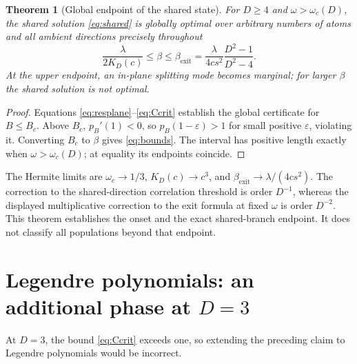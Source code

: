 \documentclass[11pt]{article}
\newcommand{\exit}{\mathrm{exit}}
\newtheorem{theorem}{Theorem}[section]
\theoremstyle{remark}
\begin{document}
\begin{theorem}[Global endpoint of the shared state]\label{thm:exit}
For $D\geq4$ and $\omega>\omega_c(D)$, the shared solution
\eqref{eq:shared} is globally optimal over arbitrary numbers of atoms
and all ambient directions precisely throughout
\begin{equation}\label{eq:bounds}
 \boxed{\frac\lambda{2K_D(c)}\leq\beta\leq
 \beta_\exit=\frac\lambda{4cs^2}\frac{D^2-1}{D^2-4}.}
\end{equation}
At the upper endpoint, an in-plane splitting mode becomes marginal;
for larger $\beta$ the shared solution is not optimal.
\end{theorem}
\begin{proof}
Equations \eqref{eq:resplane}--\eqref{eq:Ccrit} establish the global
certificate for $B\leq B_c$. Above $B_c$, $p_B'(1)<0$, so
$p_B(1-\varepsilon)>1$ for small positive $\varepsilon$, violating it.
Converting $B_c$ to $\beta$ gives \eqref{eq:bounds}. The interval has
positive length exactly when $\omega>\omega_c(D)$; at equality its
endpoints coincide.
\end{proof}

The Hermite limits are $\omega_c\to1/3$, $K_D(c)\to c^3$, and
$\beta_\exit\to\lambda/(4cs^2)$. The correction to the shared-direction
correlation threshold is order $D^{-1}$, whereas the displayed multiplicative
correction to the exit formula at fixed $\omega$ is order $D^{-2}$.
This theorem establishes the onset and the exact shared-branch endpoint.
It does not classify all populations beyond that endpoint.

\section{Legendre polynomials: an additional phase at $D=3$}

At $D=3$, the bound \eqref{eq:Ccrit} exceeds one, so extending the preceding
claim to Legendre polynomials would be incorrect.
\end{document}

